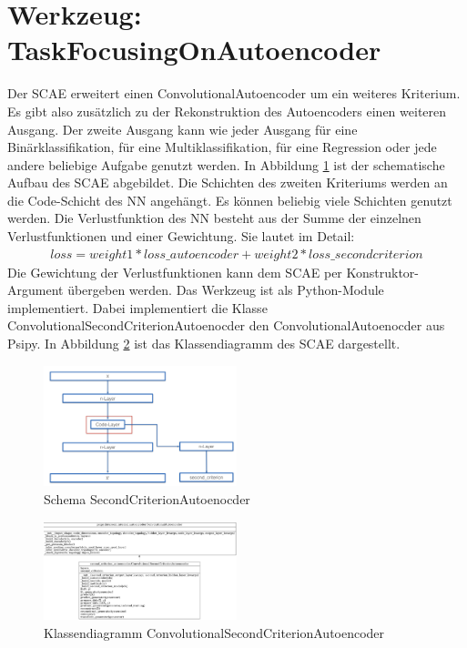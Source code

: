 	\section{Werkzeug: TaskFocusingOnAutoencoder }
	\label{sec:SecondCriterionAutoenocder}
	Der SCAE erweitert einen ConvolutionalAutoencoder um ein weiteres Kriterium. Es gibt also zusätzlich zu der Rekonstruktion des Autoencoders einen weiteren Ausgang. Der zweite Ausgang kann wie jeder Ausgang für eine Binärklassifikation, für eine Multiklassifikation, für eine Regression oder jede andere beliebige Aufgabe genutzt werden. In Abbildung \ref{img:SchemaSCAE} ist der schematische Aufbau des SCAE abgebildet. Die Schichten des zweiten Kriteriums werden an die Code-Schicht des NN angehängt. Es können beliebig  viele Schichten genutzt werden. Die Verlustfunktion des NN besteht aus der Summe der einzelnen Verlustfunktionen und einer Gewichtung. Sie lautet im Detail: 
	\begin{align}
	loss = weight1 * loss\_autoencoder + weight2 * loss\_secondcriterion
	\end{align}
	Die Gewichtung der Verlustfunktionen kann dem SCAE per Konstruktor-Argument übergeben werden. Das Werkzeug ist als Python-Module implementiert. Dabei implementiert die Klasse ConvolutionalSecondCriterionAutoenocder den ConvolutionalAutoenocder aus Psipy. In Abbildung \ref{img:KlassendiagrammCSCAE} ist das Klassendiagramm des SCAE dargestellt.
	\begin{figure}[h]
		\centering
		\includegraphics[width=0.5\textwidth, center]{bilder/Schema_Autoencoders/Schema_SCAE.png}
		\caption[Schema SecondCriterionAutoenocder]{Schema SecondCriterionAutoenocder}
		\label{img:SchemaSCAE}
	\end{figure}  
	\begin{figure}[h]
		\centering
		\includegraphics[width=0.5\textwidth, center]{bilder/Klassendiagramme/Klassendiagramm_CSCAE.png}
		\caption[Klassendiagramm ConvolutionalSecondCriterionAutoencoder]{Klassendiagramm ConvolutionalSecondCriterionAutoencoder}
	    \label{img:KlassendiagrammCSCAE}
	\end{figure}  
